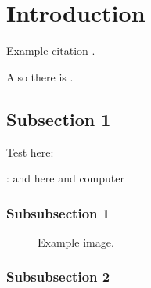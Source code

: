 \documentclass[12pt]{article} %
\begin{document}
\tableofcontents %

\newpage %


\section{Introduction} %

Example citation \cite{Figueredo:2009dg}.

Also there is \cite{bworld}.




\subsection{Subsection 1} %

Test here:

: and here and \gls{computer}


\subsubsection{Subsubsection 1} %

\lipsum[3] %

\begin{figure}[H] %
\caption{Example image.}
\label{fig:speciation}
\end{figure}


\subsubsection{Subsubsection 2} %
\end{document}
